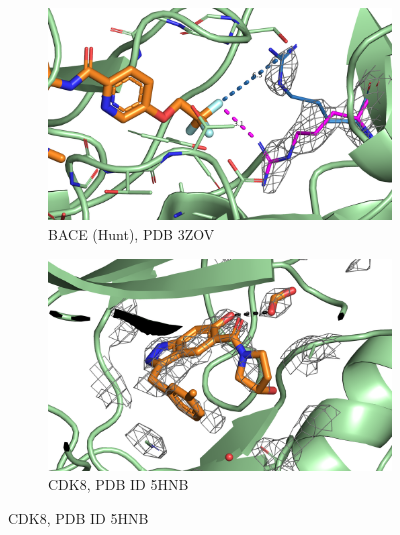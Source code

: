 \documentclass[9pt,bestpractices]{livecoms}
\begin{document}
\begin{figure}
    \centering
    \begin{subfigure}[b]{0.48\textwidth}
        \centering
        \includegraphics[width=\textwidth]{figures/crystal/pic_3zov.png}
        \caption{BACE (Hunt), PDB 3ZOV}
        \label{fig:3zov}
    \end{subfigure}
    \hfill
    \begin{subfigure}[b]{0.48\textwidth}
        \centering
        \includegraphics[width=\textwidth]{figures/crystal/pic_5hnb.png}
        \caption{CDK8, PDB ID 5HNB}
        \label{fig:5hnb}
    \end{subfigure}
    

\end{figure}
\end{document}
